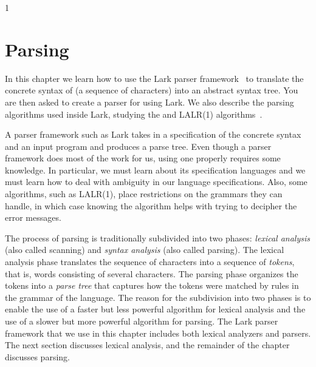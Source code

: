 \documentclass[7x10]{TimesAPriori_MIT}%
\def\pythonEd{1}
\providecommand{\BookEdition}{1}
\let\edition\BookEdition
\newcommand{\pythonColor}[0]{}
\numberwithin{theorem}{chapter}
\numberwithin{definition}{chapter}
\numberwithin{equation}{chapter}
\begin{document}
{\if\edition\pythonEd\pythonColor
\chapter{Parsing}
\label{ch:parsing}
\setcounter{footnote}{0}

In this chapter we learn how to use the Lark parser
framework~\citep{shinan20:_lark_docs} to translate the concrete syntax
of \LangInt{} (a sequence of characters) into an abstract syntax tree.
You are then asked to create a parser for \LangVar{} using Lark.
We also describe the parsing algorithms used inside Lark, studying the
\citet{Earley:1970ly} and LALR(1) algorithms~\citep{DeRemer69,Anderson73}.

A parser framework such as Lark takes in a specification of the
concrete syntax and an input program and produces a parse tree. Even
though a parser framework does most of the work for us, using one
properly requires some knowledge.  In particular, we must learn about
its specification languages and we must learn how to deal with
ambiguity in our language specifications. Also, some algorithms, such
as LALR(1), place restrictions on the grammars they can handle, in
which case knowing the algorithm helps with trying to decipher the
error messages.

The process of parsing is traditionally subdivided into two phases:
\emph{lexical analysis} (also called scanning) and \emph{syntax
  analysis} (also called parsing). The lexical analysis phase
translates the sequence of characters into a sequence of
\emph{tokens}, that is, words consisting of several characters. The
parsing phase organizes the tokens into a \emph{parse tree} that
captures how the tokens were matched by rules in the grammar of the
language. The reason for the subdivision into two phases is to enable
the use of a faster but less powerful algorithm for lexical analysis
and the use of a slower but more powerful algorithm for parsing.
%
%
The Lark parser framework that we use in this chapter includes both
lexical analyzers and parsers. The next section discusses lexical
analysis, and the remainder of the chapter discusses parsing.


}
\end{document}
